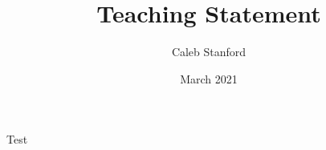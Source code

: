 \documentclass{article}
\title{Teaching Statement}
\author{Caleb Stanford}
\date{March 2021}
\begin{document}
\maketitle{}

Test~\cite{popl19}



\end{document}
